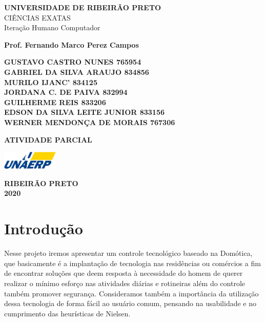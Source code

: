 \documentclass[12pt,a4paper]{article} \usepackage[utf8]{inputenc}
\begin{document}
\begin{titlepage}
	\begin{center}
		\textbf{UNIVERSIDADE DE RIBEIRÃO PRETO} \\
		CIÊNCIAS EXATAS \\
		Iteração Humano Computador

			\vspace{1.5cm}

			\textbf{Prof. Fernando Marco Perez Campos} \vspace{3.5cm}

			\textbf{GUSTAVO CASTRO NUNES  765954} \\
			\textbf{GABRIEL DA SILVA ARAUJO 834856} \\
			\textbf{MURILO IJANC’ 834125} \\
			\textbf{JORDANA C. DE PAIVA 832994} \\
			\textbf{GUILHERME REIS 833206} \\
			\textbf{EDSON DA SILVA LEITE JUNIOR 833156} \\
			\textbf{WERNER MENDONÇA DE MORAIS 767306} \\

			\vspace{3.5cm}

			\textbf{ATIVIDADE PARCIAL}

			\vfill

			\vspace{0.8cm}

			\includegraphics[width=0.2\textwidth]{unaerp}

			\textbf{RIBEIRÃO PRETO} \\
			\textbf{2020}
	\end{center}
\end{titlepage}


\thispagestyle{empty}

\tableofcontents

\newpage

\thispagestyle{empty} \listoffigures \thispagestyle{empty} \newpage


\section{Introdução} Nesse projeto iremos apresentar um controle tecnológico
baseado na Domótica, que basicamente é a implantação de tecnologia nas
residências ou comércios a fim de encontrar soluções que deem resposta à
necessidade do homem de querer realizar o mínimo esforço nas atividades diárias
e rotineiras além do controle também promover segurança. Consideramos também a
importância da utilização dessa tecnologia de forma fácil ao usuário comum,
pensando na usabilidade e no cumprimento das heurísticas de Nielsen.
\end{document}
